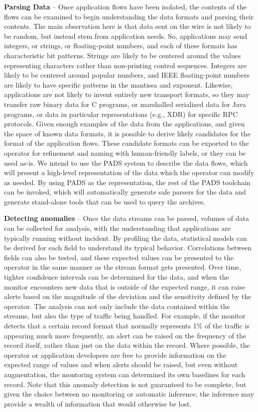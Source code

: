 {\bf Parsing Data} -- Once application flows have been isolated, the
contents of the flows can be examined to begin understanding the data
formats and parsing their contents. The main observation here is that
data sent on the wire is not likely to be random, but instead stem
from application needs. So, applications may send integers, or
strings, or floating-point numbers, and each of these formats has
characteristic bit patterns. Strings are likely to be centered around
the values representing characters rather than non-printing control
sequences. Integers are likely to be centered around popular numbers,
and IEEE floating-point numbers are likely to have specific patterns
in the mantissa and exponent.  Likewise, applications are not likely
to invent entirely new transport formats, so they may transfer raw
binary data for C programs, or marshalled serialized data for Java
programs, or data in particular representations (e.g., XDR) for
specific RPC protocols. Given enough examples of the data from the
applications, and given the space of known data formats, it is
possible to derive likely candidates for the format of the application
flows. These candidate formats can be exported to the operator for
refinement and naming with human-friendly labels, or they can be used
as-is. We intend to use the PADS system to describe the data flows,
which will present a high-level representation of the data which the
operator can modify as needed. By using PADS as the representation,
the rest of the PADS toolchain can be invoked, which will
automatically generate safe parsers for the data and generate
stand-alone tools that can be used to query the archives.

{\bf Detecting anomalies} -- Once the data streams can be parsed,
volumes of data can be collected for analysis, with the understanding
that applications are typically running without incident. By profiling
the data, statistical models can be derived for each field to
understand its typical behavior. Correlations between fields can also
be tested, and these expected values can be presented to the operator
in the same manner as the stream format gets presented. Over time,
tighter confidence intervals can be determined for the data, and when
the monitor encounters new data that is outside of the expected range,
it can raise alerts based on the magnitude of the deviation and the
sensitivity defined by the operator. The analysis can not only include
the data contained within the streams, but also the type of traffic
being handled. For example, if the monitor detects that a certain
record format that normally represents 1\% of the traffic is appearing
much more frequently, an alert can be raised on the frequency of the
record itself, rather than just on the data within the record. Where
possible, the operator or application developers are free to provide
information on the expected range of values and when alerts should be
raised, but even without augmentation, the montoring system can
determined its own baselines for each record. Note that this anomaly
detection is not guaranteed to be complete, but given the choice
between no monitoring or automatic inference, the inference may
provide a wealth of information that would otherwise be lost.

